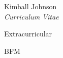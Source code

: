 \documentclass[10pt]{article}
\begin{document}
\begin{cv}{Kimball Johnson\\{\large \itshape Curriculum Vitae}}
\begin{cvlist}{Extracurricular}
\item BFM
\end{cvlist}

\setlength{\oldcvlabelwidth}{\cvlabelwidth}
\setlength{\cvlabelwidth}{1em}
\setlength{\cvlabelwidth}{\oldcvlabelwidth}

\end{cv}
\end{document}
